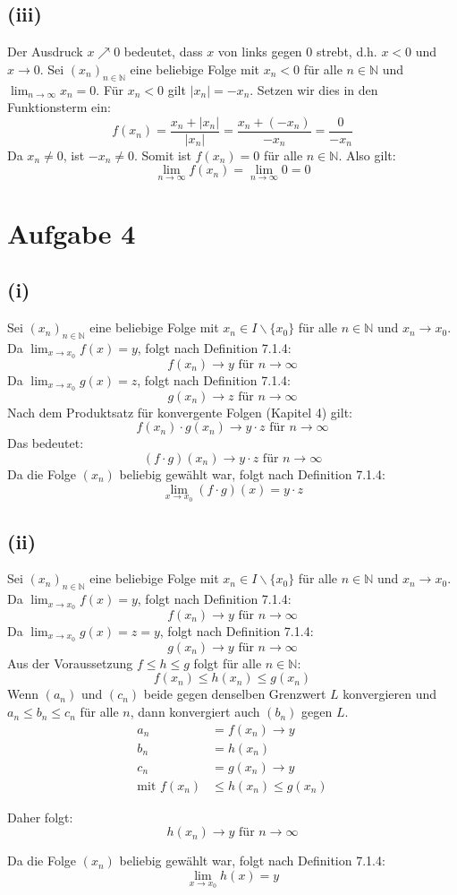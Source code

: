 \documentclass{article}
\begin{document}
\subsection*{(iii)}
Der Ausdruck \(x \nearrow 0\) bedeutet, dass \(x\) von links gegen \(0\) strebt, d.h. \(x < 0\) und \(x \to 0\).
Sei \((x_n)_{n\in\mathbb{N}}\) eine beliebige Folge mit \(x_n < 0\) für alle \(n \in \mathbb{N}\) und \(\lim_{n\to\infty} x_n = 0\).
Für \(x_n < 0\) gilt \(|x_n| = -x_n\).
Setzen wir dies in den Funktionsterm ein:
\[ f(x_n) = \frac{x_n + |x_n|}{|x_n|} = \frac{x_n + (-x_n)}{-x_n} = \frac{0}{-x_n} \]
Da \(x_n \neq 0\), ist \(-x_n \neq 0\).
Somit ist \(f(x_n) = 0\) für alle \(n \in \mathbb{N}\).
Also gilt:
\[ \lim_{n\to\infty} f(x_n) = \lim_{n\to\infty} 0 = 0 \]

\section*{Aufgabe 4}
\subsection*{(i)}
Sei $(x_n)_{n \in \mathbb{N}}$ eine beliebige Folge mit $x_n \in I \backslash \{x_0\}$ für alle $n \in \mathbb{N}$ und $x_n \rightarrow x_0$.
Da $\lim_{x \rightarrow x_0} f(x) = y$, folgt nach Definition 7.1.4:
\[f(x_n) \rightarrow y \text{ für } n \rightarrow \infty\]
Da $\lim_{x \rightarrow x_0} g(x) = z$, folgt nach Definition 7.1.4:
\[g(x_n) \rightarrow z \text{ für } n \rightarrow \infty\]
Nach dem Produktsatz für konvergente Folgen (Kapitel 4) gilt:
\[f(x_n) \cdot g(x_n) \rightarrow y \cdot z \text{ für } n \rightarrow \infty\]
Das bedeutet:
\[(f \cdot g)(x_n) \rightarrow y \cdot z \text{ für } n \rightarrow \infty\]
Da die Folge $(x_n)$ beliebig gewählt war, folgt nach Definition 7.1.4:
\[\lim_{x \rightarrow x_0} (f \cdot g)(x) = y \cdot z\]

\subsection*{(ii)}
Sei $(x_n)_{n \in \mathbb{N}}$ eine beliebige Folge mit $x_n \in I \backslash \{x_0\}$ für alle $n \in \mathbb{N}$ und $x_n \rightarrow x_0$.
Da $\lim_{x \rightarrow x_0} f(x) = y$, folgt nach Definition 7.1.4:
\[f(x_n) \rightarrow y \text{ für } n \rightarrow \infty\]
Da $\lim_{x \rightarrow x_0} g(x) = z = y$, folgt nach Definition 7.1.4:
\[g(x_n) \rightarrow y \text{ für } n \rightarrow \infty\]
Aus der Voraussetzung $f \leq h \leq g$ folgt für alle $n \in \mathbb{N}$:
\[f(x_n) \leq h(x_n) \leq g(x_n)\]
Wenn $(a_n)$ und $(c_n)$ beide gegen denselben Grenzwert $L$ konvergieren und $a_n \leq b_n \leq c_n$ für alle $n$, dann konvergiert auch $(b_n)$ gegen $L$. \\
\begin{align*}
a_n &= f(x_n) \rightarrow y\\
b_n &= h(x_n)\\  
c_n &= g(x_n) \rightarrow y\\
\text{mit } f(x_n) &\leq h(x_n) \leq g(x_n)
\end{align*}

Daher folgt:
\[h(x_n) \rightarrow y \text{ für } n \rightarrow \infty\]

Da die Folge $(x_n)$ beliebig gewählt war, folgt nach Definition 7.1.4:
\[\lim_{x \rightarrow x_0} h(x) = y\]
\end{document}
